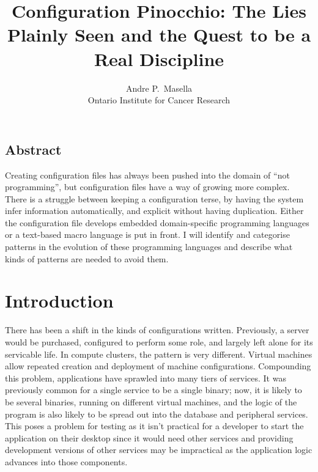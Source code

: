 \documentclass[letterpaper,twocolumn,10pt]{article}
\begin{document}
\date{}
\title{\Large \bf Configuration Pinocchio: The Lies Plainly Seen and the Quest to be a Real Discipline}

\author{
{\rm Andre P.~Masella}\\
Ontario Institute for Cancer Research
} %

\maketitle

\thispagestyle{empty}


\subsection*{Abstract}
Creating configuration files has always been pushed into the domain of ``not programming'', but configuration files have a way of growing more complex. There is a struggle between keeping a configuration terse, by having the system infer information automatically, and explicit without having duplication. Either the configuration file develops embedded domain-specific programming languages or a text-based macro language is put in front. I will identify and categorise patterns in the evolution of these programming languages and describe what kinds of patterns are needed to avoid them.

\section{Introduction}
There has been a shift in the kinds of configurations written. Previously, a server would be purchased, configured to perform some role, and largely left alone for its servicable life. In compute clusters, the pattern is very different. Virtual machines allow repeated creation and deployment of machine configurations. Compounding this problem, applications have sprawled into many tiers of services. It was previously common for a single service to be a single binary; now, it is likely to be several binaries, running on different virtual machines, and the logic of the program is also likely to be spread out into the database and peripheral services. This poses a problem for testing as it isn't practical for a developer to start the application on their desktop since it would need other services and providing development versions of other services may be impractical as the application logic advances into those components.
\end{document}
